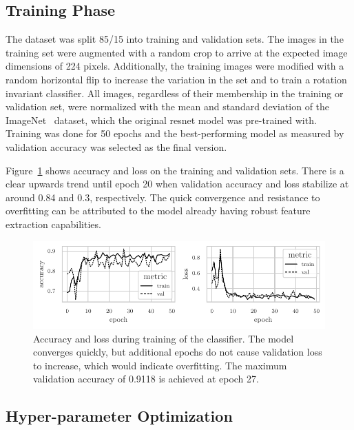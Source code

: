 \documentclass[draft,final]{vutinfth} %
\begin{document}
\subsection{Training Phase}
\label{ssec:classifier-training}

The dataset was split 85/15 into training and validation sets. The
images in the training set were augmented with a random crop to arrive
at the expected image dimensions of 224 pixels. Additionally, the
training images were modified with a random horizontal flip to
increase the variation in the set and to train a rotation invariant
classifier. All images, regardless of their membership in the training
or validation set, were normalized with the mean and standard
deviation of the ImageNet~\cite{deng2009} dataset, which the original
\gls{resnet} model was pre-trained with. Training was done for 50
epochs and the best-performing model as measured by validation
accuracy was selected as the final version.

Figure~\ref{fig:classifier-training-metrics} shows accuracy and loss
on the training and validation sets. There is a clear upwards trend
until epoch 20 when validation accuracy and loss stabilize at around
0.84 and 0.3, respectively. The quick convergence and resistance to
overfitting can be attributed to the model already having robust
feature extraction capabilities.

\begin{figure}
  \centering
  \includegraphics{graphics/classifier-metrics.pdf}
  \caption[Classifier accuracy and loss during training.]{Accuracy and
    loss during training of the classifier. The model converges
    quickly, but additional epochs do not cause validation loss to
    increase, which would indicate overfitting. The maximum validation
    accuracy of 0.9118 is achieved at epoch 27.}
  \label{fig:classifier-training-metrics}
\end{figure}

\subsection{Hyper-parameter Optimization}
\label{ssec:classifier-hyp-opt}
\end{document}
